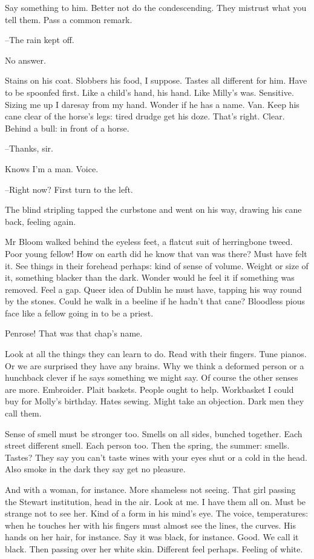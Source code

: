 Say something to him.
Better not do the condescending.
They mistrust what you tell them.
Pass a common remark.

--The rain kept off.

No answer.

Stains on his coat.
Slobbers his food, I suppose.
Tastes all different for him.
Have to be spoonfed first.
Like a child's hand, his hand.
Like Milly's was.
Sensitive.
Sizing me up I daresay from my hand.
Wonder if he has a name.
Van.
Keep his cane clear of the horse's legs:
tired drudge get his doze.
That's right.
Clear.
Behind a bull:
in front of a horse.

--Thanks, sir.

Knows I'm a man.
Voice.

--Right now?
First turn to the left.

The blind stripling tapped the curbstone and went on his way,
drawing his cane back,
feeling again.

Mr Bloom walked behind the eyeless feet,
a flatcut suit of herringbone tweed.
Poor young fellow!
How on earth did he know that van was there?
Must have felt it.
See things in their forehead perhaps:
kind of sense of volume.
Weight or size of it,
something blacker than the dark.
Wonder would he feel it if something was removed.
Feel a gap.
Queer idea of Dublin he must have,
tapping his way round by the stones.
Could he walk in a beeline if he hadn't that cane?
Bloodless pious face like a fellow going in to be a priest.

Penrose!
That was that chap's name.

Look at all the things they can learn to do.
Read with their fingers.
Tune pianos.
Or we are surprised they have any brains.
Why we think a deformed person or a hunchback clever if he says something we might say.
Of course the other senses are more.
Embroider.
Plait baskets.
People ought to help.
Workbasket I could buy for Molly's birthday.
Hates sewing.
Might take an objection.
Dark men they call them.

Sense of smell must be stronger too.
Smells on all sides, bunched together.
Each street different smell.
Each person too.
Then the spring, the summer:
smells.
Tastes?
They say you can't taste wines with your eyes shut or a cold in the head.
Also smoke in the dark they say get no pleasure.

And with a woman, for instance.
More shameless not seeing.
That girl passing the Stewart institution,
head in the air.
Look at me.
I have them all on.
Must be strange not to see her.
Kind of a form in his mind's eye.
The voice, temperatures:
when he touches her with his fingers
must almost see the lines, the curves.
His hands on her hair, for instance.
Say it was black, for instance.
Good.
We call it black.
Then passing over her white skin.
Different feel perhaps.
Feeling of white.

